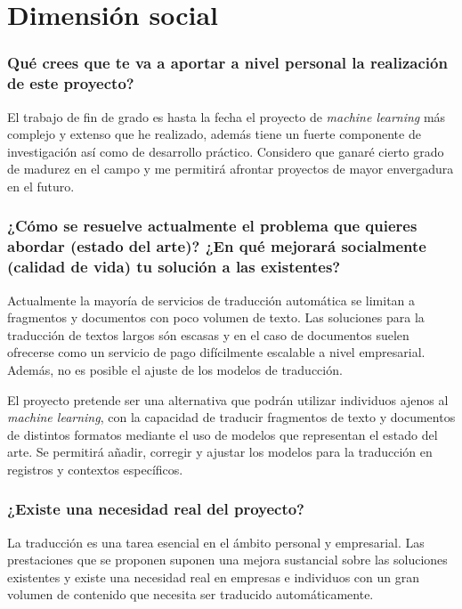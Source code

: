 \section{Dimensión social}
\subsubsection{Qué crees que te va a aportar a nivel personal la realización de este proyecto?}

El trabajo de fin de grado es hasta la fecha el proyecto de \textit{machine learning} más
complejo y extenso que he realizado, además tiene un fuerte componente de investigación
así como de desarrollo práctico. Considero que ganaré cierto grado de madurez
en el campo y me permitirá afrontar proyectos de mayor envergadura en el futuro.

\subsubsection{¿Cómo se resuelve actualmente el problema que quieres abordar (estado del arte)?
¿En qué mejorará socialmente (calidad de vida) tu solución a las existentes?}

Actualmente la mayoría de servicios de traducción automática se limitan a fragmentos y documentos
con poco volumen de texto. Las soluciones para la traducción de textos largos
són escasas y en el caso de documentos suelen ofrecerse
como un servicio de pago difícilmente escalable a nivel empresarial. Además, no es posible
el ajuste de los modelos de traducción.

El proyecto pretende ser una alternativa que podrán utilizar individuos ajenos al \textit{machine learning},
con la capacidad de traducir fragmentos de texto y documentos de distintos formatos mediante
el uso de modelos que representan el estado del arte.
Se permitirá añadir, corregir y ajustar los modelos para la traducción en registros y contextos
específicos.

\subsubsection{¿Existe una necesidad real del proyecto?}

La traducción es una tarea esencial en el ámbito personal y empresarial. Las prestaciones que se proponen
suponen una mejora sustancial sobre las soluciones existentes y existe una necesidad real en empresas
e individuos con un gran volumen de contenido que necesita ser traducido automáticamente.


